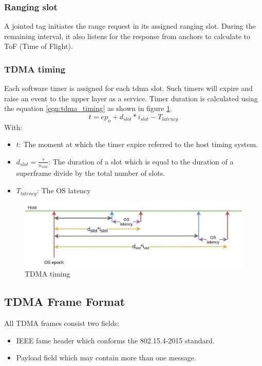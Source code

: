 \documentclass[\main/thesis.tex]{subfiles}
\begin{document}
\subsubsection{Ranging slot}
A jointed tag initiates the range request in its assigned ranging slot. During the remaining interval, it also listens for the response from anchors to calculate to ToF (Time of Flight).

\subsubsection{TDMA timing}
Each software timer is assigned for each tdma slot. Such timers will expire and raise an event to the upper layer as a service. Timer duration is calculated using the equation \ref{eqn:tdma_timing} as shown in figure \ref{fig:tdma_timing}.
\begin{equation}
    t = ep_o + d_{slot}*i_{slot} - T_{latency}
    \label{eqn:tdma_timing}
\end{equation}
With: 
\begin{itemize}
    \item $t$: The moment at which the timer expire referred to the host timing system.
    \item $d_{slot} = \frac{\tau}{n_{slot}}$: The duration of a slot which is equal to the duration of a superframe divide by the total number of slots.
    \item $T_{latency}$: The OS latency
\end{itemize}

\begin{figure}[H]
    \begin{center}
        \includegraphics[width=1\textwidth]{tdma_timing.png}
    \end{center}
    \caption{TDMA timing}
    \label{fig:tdma_timing}
\end{figure}


\subsection{TDMA Frame Format}
All TDMA frames consist two fields:
\begin{itemize}
    \item IEEE fame header which conforms the 802.15.4-2015 standard.
    \item Payload field which may contain more than one message. 
\end{itemize}
\end{document}
